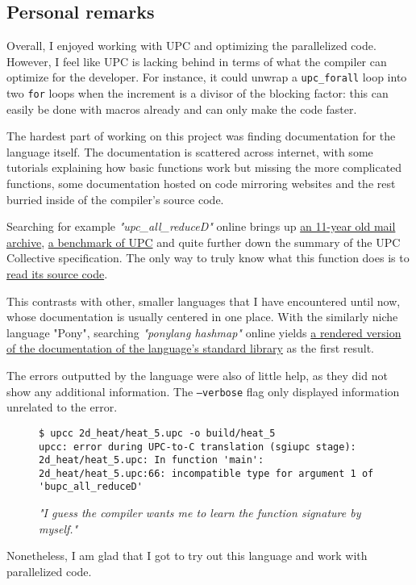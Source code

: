 \documentclass[12pt]{article}
\begin{document}
\subsection{Personal remarks}

Overall, I enjoyed working with UPC and optimizing the parallelized code.
However, I feel like UPC is lacking behind in terms of what the compiler can optimize for the developer.
For instance, it could unwrap a \texttt{upc\_forall} loop into two \texttt{for} loops when the increment is a divisor of the blocking factor: this can easily be done with macros already and can only make the code faster.

The hardest part of working on this project was finding documentation for the language itself.
The documentation is scattered across internet, with some tutorials explaining how basic functions work but missing the more complicated functions, some documentation hosted on code mirroring websites and the rest burried inside of the compiler's source code.

Searching for example \textit{"upc\_all\_reduceD"} online brings up \href{https://upc.lbl.gov/hypermail/upc-users/0550.html}{an 11-year old mail archive}, \href{https://github.com/ROCm-Developer-Tools/OSU_Microbenchmarks/blob/master/upc/osu_upc_all_broadcast.c}{a benchmark of UPC} and quite further down the summary of the UPC Collective specification.
The only way to truly know what this function does is to \href{https://fossies.org/linux/berkeley_upc/upc-tests/UPC-Coll-RefImp/upc_all_reduce.c}{read its source code}.

This contrasts with other, smaller languages that I have encountered until now, whose documentation is usually centered in one place.
With the similarly niche language "Pony", searching \textit{"ponylang hashmap"} online yields \href{https://stdlib.ponylang.io/collections-HashMap/}{a rendered version of the documentation of the language's standard library} as the first result.

The errors outputted by the language were also of little help, as they did not show any additional information. The \texttt{--verbose} flag only displayed information unrelated to the error.

\begin{figure}
  \begin{lstlisting}[style=C]
$ upcc 2d_heat/heat_5.upc -o build/heat_5
upcc: error during UPC-to-C translation (sgiupc stage):
2d_heat/heat_5.upc: In function 'main':
2d_heat/heat_5.upc:66: incompatible type for argument 1 of 'bupc_all_reduceD'
  \end{lstlisting}
  \caption{\textit{"I guess the compiler wants me to learn the function signature by myself."}}
\end{figure}

Nonetheless, I am glad that I got to try out this language and work with parallelized code.

\newpage
{}


\end{document}
